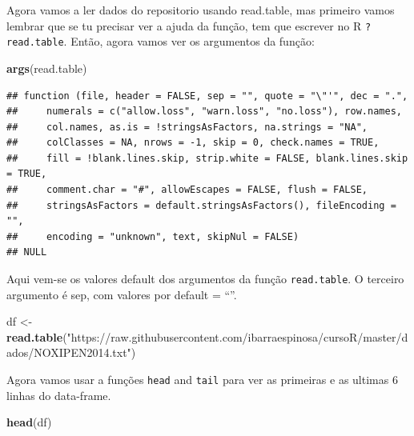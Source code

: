 \documentclass[]{book}
\newenvironment{Shaded}{\begin{snugshade}}{\end{snugshade}}
\newcommand{\KeywordTok}[1]{\textcolor[rgb]{0.13,0.29,0.53}{\textbf{#1}}}
\newcommand{\StringTok}[1]{\textcolor[rgb]{0.31,0.60,0.02}{#1}}
\newcommand{\NormalTok}[1]{#1}
\begin{document}
Agora vamos a ler dados do repositorio usando read.table, mas primeiro
vamos lembrar que se tu precisar ver a ajuda da função, tem que escrever
no R \texttt{?read.table}. Então, agora vamos ver os argumentos da
função:

\begin{Shaded}
\begin{Highlighting}[]
\KeywordTok{args}\NormalTok{(read.table)}
\end{Highlighting}
\end{Shaded}

\begin{verbatim}
## function (file, header = FALSE, sep = "", quote = "\"'", dec = ".", 
##     numerals = c("allow.loss", "warn.loss", "no.loss"), row.names, 
##     col.names, as.is = !stringsAsFactors, na.strings = "NA", 
##     colClasses = NA, nrows = -1, skip = 0, check.names = TRUE, 
##     fill = !blank.lines.skip, strip.white = FALSE, blank.lines.skip = TRUE, 
##     comment.char = "#", allowEscapes = FALSE, flush = FALSE, 
##     stringsAsFactors = default.stringsAsFactors(), fileEncoding = "", 
##     encoding = "unknown", text, skipNul = FALSE) 
## NULL
\end{verbatim}

Aqui vem-se os valores default dos argumentos da função
\texttt{read.table}. O terceiro argumento é sep, com valores por default
= ``''.

\begin{Shaded}
\begin{Highlighting}[]
\NormalTok{df <-}\StringTok{ }\KeywordTok{read.table}\NormalTok{(}\StringTok{"https://raw.githubusercontent.com/ibarraespinosa/cursoR/master/dados/NOXIPEN2014.txt"}\NormalTok{)}
\end{Highlighting}
\end{Shaded}

Agora vamos usar a funções \texttt{head} and \texttt{tail} para ver as
primeiras e as ultimas 6 linhas do data-frame.

\begin{Shaded}
\begin{Highlighting}[]
\KeywordTok{head}\NormalTok{(df)}
\end{Highlighting}
\end{Shaded}
\end{document}
